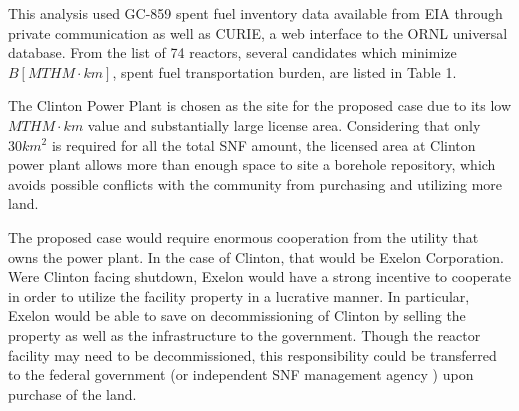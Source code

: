 This analysis used GC-859 spent fuel inventory data available from \gls{EIA} 
through private communication \cite{domenico_GC-859_2016} as well as \gls{CURIE}, a web interface to 
the \gls{ORNL} universal database\cite{ornl_centralized_2016}.
From the list of 74 reactors, several candidates which minimize $B [MTHM\cdot 
km]$, spent fuel transportation burden, are listed in Table 1.
    
    \begin{table}[h]
    	\centering
    	
    	\caption {Reactors with relatively small spent fuel transportation burden $ [MTHM\cdot km]$.}
    		\end {table}




The Clinton Power Plant is chosen as the site for the proposed case due to its
low $MTHM\cdot km$ value and substantially large license 
area\cite{nrc_chapter_2007}.
Considering that only
$30km^2$ is required for all the total \gls{SNF} amount, the licensed area at Clinton
power plant allows more than  enough space to site a borehole repository, which
avoids possible conflicts with the community from purchasing and utilizing more
land. 

The proposed case would require enormous cooperation from the utility that owns
the power plant. In the case of Clinton, that would be Exelon Corporation. 
Were Clinton facing shutdown, Exelon would have a strong incentive to 
cooperate in order to utilize the facility property
in a lucrative manner. In particular, Exelon would be able to save on decommissioning of
Clinton by selling the property as well as the infrastructure to the 
government. Though the reactor facility may need to be decommissioned, 
this responsibility could be transferred to the federal government (or 
independent \gls{SNF} management agency \cite{ayers_blue_2012}) upon 
purchase of the land.

